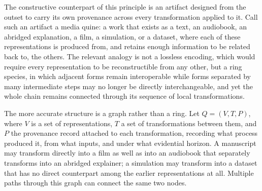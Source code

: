 \documentclass[11pt]{article}
\begin{document}
The constructive counterpart of this principle is an artifact designed from the outset to carry its own provenance across every transformation applied to it. Call such an artifact a media quine: a work that exists as a text, an audiobook, an abridged explanation, a film, a simulation, or a dataset, where each of these representations is produced from, and retains enough information to be related back to, the others. The relevant analogy is not a lossless encoding, which would require every representation to be reconstructible from any other, but a ring species, in which adjacent forms remain interoperable while forms separated by many intermediate steps may no longer be directly interchangeable, and yet the whole chain remains connected through its sequence of local transformations.

The more accurate structure is a graph rather than a ring. Let $Q = (V, T, P)$, where $V$ is a set of representations, $T$ a set of transformations between them, and $P$ the provenance record attached to each transformation, recording what process produced it, from what inputs, and under what evidential horizon. A manuscript may transform directly into a film as well as into an audiobook that separately transforms into an abridged explainer; a simulation may transform into a dataset that has no direct counterpart among the earlier representations at all. Multiple paths through this graph can connect the same two nodes.
\end{document}
